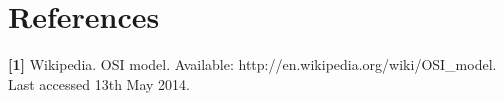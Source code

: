 
\raggedbottom


\pagestyle{empty}

\pagestyle{plain}

\tableofcontents





%
%


\chapter{References}
\textbf{[1]} Wikipedia. OSI model. Available: http://en.wikipedia.org/wiki/OSI\_model. Last accessed 13th May 2014.\\

